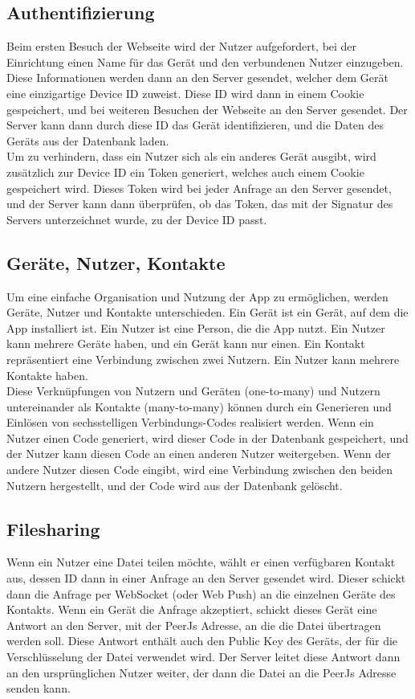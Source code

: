 \documentclass[a4paper]{article}
\begin{document}
\subsection{Authentifizierung}

Beim ersten Besuch der Webseite wird der Nutzer aufgefordert, bei der
Einrichtung einen Name für das Gerät und den verbundenen Nutzer einzugeben.
Diese Informationen werden dann an den Server gesendet, welcher dem Gerät eine
einzigartige Device ID zuweist. Diese ID wird dann in einem Cookie gespeichert,
und bei weiteren Besuchen der Webseite an den Server gesendet. Der Server kann
dann durch diese ID das Gerät identifizieren, und die Daten des Geräts aus der
Datenbank laden.\\
Um zu verhindern, dass ein Nutzer sich als ein anderes Gerät ausgibt, wird
zusätzlich zur Device ID ein Token generiert, welches auch einem Cookie
gespeichert wird. Dieses Token wird bei jeder Anfrage an den Server gesendet,
und der Server kann dann überprüfen, ob das Token, das mit der Signatur des
Servers unterzeichnet wurde, zu der Device ID passt.

\subsection{Geräte, Nutzer, Kontakte}

Um eine einfache Organisation und Nutzung der App zu ermöglichen, werden Geräte,
Nutzer und Kontakte unterschieden. Ein Gerät ist ein Gerät, auf dem die App
installiert ist. Ein Nutzer ist eine Person, die die App nutzt. Ein Nutzer kann
mehrere Geräte haben, und ein Gerät kann nur einen. Ein Kontakt repräsentiert
eine Verbindung zwischen zwei Nutzern. Ein Nutzer kann mehrere Kontakte haben.\\
Diese Verknüpfungen von Nutzern und Geräten (one-to-many) und Nutzern
untereinander als Kontakte (many-to-many) können durch ein Generieren und
Einlösen von sechsstelligen Verbindungs-Codes realisiert werden. Wenn ein Nutzer
einen Code generiert, wird dieser Code in der Datenbank gespeichert, und der
Nutzer kann diesen Code an einen anderen Nutzer weitergeben. Wenn der andere
Nutzer diesen Code eingibt, wird eine Verbindung zwischen den beiden Nutzern
hergestellt, und der Code wird aus der Datenbank gelöscht.


\subsection{Filesharing}
Wenn ein Nutzer eine Datei teilen möchte, wählt er einen verfügbaren Kontakt
aus, dessen ID dann in einer Anfrage an den Server gesendet wird. Dieser schickt
dann die Anfrage per WebSocket (oder Web Push) an die einzelnen Geräte des
Kontakts. Wenn ein Gerät die Anfrage akzeptiert, schickt dieses Gerät eine
Antwort an den Server, mit der PeerJs Adresse, an die die Datei übertragen
werden soll. Diese Antwort enthält auch den Public Key des Geräts, der für die
Verschlüsselung der Datei verwendet wird. Der Server leitet diese Antwort dann
an den ursprünglichen Nutzer weiter, der dann die Datei an die PeerJs Adresse
senden kann.
\end{document}
